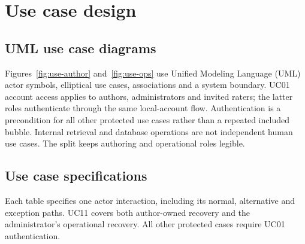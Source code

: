 \clearpage\section{Use case design}\label{sec:usecases}
\subsection{UML use case diagrams}
Figures~\ref{fig:use-author} and~\ref{fig:use-ops} use Unified Modeling Language (UML) actor symbols, elliptical use cases, associations and a system boundary. UC01 account access applies to authors, administrators and invited raters; the latter roles authenticate through the same local-account flow. Authentication is a precondition for all other protected use cases rather than a repeated included bubble. Internal retrieval and database operations are not independent human use cases. The split keeps authoring and operational roles legible.
\clearpage
\subsection{Use case specifications}
Each table specifies one actor interaction, including its normal, alternative and exception paths. UC11 covers both author-owned recovery and the administrator's operational recovery. All other protected cases require UC01 authentication.

